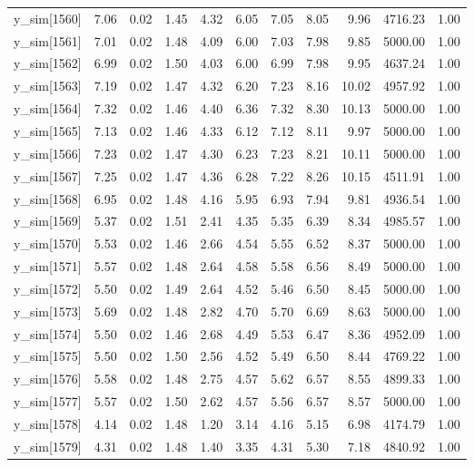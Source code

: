 \begin{table}[ht]
\begin{tabular}{rrrrrrrrrrr}
  y\_sim[1560] & 7.06 & 0.02 & 1.45 & 4.32 & 6.05 & 7.05 & 8.05 & 9.96 & 4716.23 & 1.00 \\ 
  y\_sim[1561] & 7.01 & 0.02 & 1.48 & 4.09 & 6.00 & 7.03 & 7.98 & 9.85 & 5000.00 & 1.00 \\ 
  y\_sim[1562] & 6.99 & 0.02 & 1.50 & 4.03 & 6.00 & 6.99 & 7.98 & 9.95 & 4637.24 & 1.00 \\ 
  y\_sim[1563] & 7.19 & 0.02 & 1.47 & 4.32 & 6.20 & 7.23 & 8.16 & 10.02 & 4957.92 & 1.00 \\ 
  y\_sim[1564] & 7.32 & 0.02 & 1.46 & 4.40 & 6.36 & 7.32 & 8.30 & 10.13 & 5000.00 & 1.00 \\ 
  y\_sim[1565] & 7.13 & 0.02 & 1.46 & 4.33 & 6.12 & 7.12 & 8.11 & 9.97 & 5000.00 & 1.00 \\ 
  y\_sim[1566] & 7.23 & 0.02 & 1.47 & 4.30 & 6.23 & 7.23 & 8.21 & 10.11 & 5000.00 & 1.00 \\ 
  y\_sim[1567] & 7.25 & 0.02 & 1.47 & 4.36 & 6.28 & 7.22 & 8.26 & 10.15 & 4511.91 & 1.00 \\ 
  y\_sim[1568] & 6.95 & 0.02 & 1.48 & 4.16 & 5.95 & 6.93 & 7.94 & 9.81 & 4936.54 & 1.00 \\ 
  y\_sim[1569] & 5.37 & 0.02 & 1.51 & 2.41 & 4.35 & 5.35 & 6.39 & 8.34 & 4985.57 & 1.00 \\ 
  y\_sim[1570] & 5.53 & 0.02 & 1.46 & 2.66 & 4.54 & 5.55 & 6.52 & 8.37 & 5000.00 & 1.00 \\ 
  y\_sim[1571] & 5.57 & 0.02 & 1.48 & 2.64 & 4.58 & 5.58 & 6.56 & 8.49 & 5000.00 & 1.00 \\ 
  y\_sim[1572] & 5.50 & 0.02 & 1.49 & 2.64 & 4.52 & 5.46 & 6.50 & 8.45 & 5000.00 & 1.00 \\ 
  y\_sim[1573] & 5.69 & 0.02 & 1.48 & 2.82 & 4.70 & 5.70 & 6.69 & 8.63 & 5000.00 & 1.00 \\ 
  y\_sim[1574] & 5.50 & 0.02 & 1.46 & 2.68 & 4.49 & 5.53 & 6.47 & 8.36 & 4952.09 & 1.00 \\ 
  y\_sim[1575] & 5.50 & 0.02 & 1.50 & 2.56 & 4.52 & 5.49 & 6.50 & 8.44 & 4769.22 & 1.00 \\ 
  y\_sim[1576] & 5.58 & 0.02 & 1.48 & 2.75 & 4.57 & 5.62 & 6.57 & 8.55 & 4899.33 & 1.00 \\ 
  y\_sim[1577] & 5.57 & 0.02 & 1.50 & 2.62 & 4.57 & 5.56 & 6.57 & 8.57 & 5000.00 & 1.00 \\ 
  y\_sim[1578] & 4.14 & 0.02 & 1.48 & 1.20 & 3.14 & 4.16 & 5.15 & 6.98 & 4174.79 & 1.00 \\ 
  y\_sim[1579] & 4.31 & 0.02 & 1.48 & 1.40 & 3.35 & 4.31 & 5.30 & 7.18 & 4840.92 & 1.00 \\ 

\end{tabular}
\end{table}

